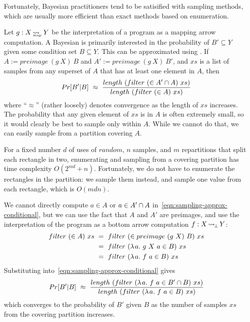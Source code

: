 Fortunately, Bayesian practitioners tend to be satisified with sampling methods, which are usually more efficient than exact methods based on enumeration.

Let $g : X \operatorname{\rightsquigarrow_{\mspace{-21mu}_\mathrm{map}}} Y$ be the interpretation of a program as a mapping arrow computation.
A Bayesian is primarily interested in the probability of $B' \subseteq Y$ given some condition set $B \subseteq Y$.
This can be approximated using .
If $A := preimage~(g~X)~B$ and $A' := preimage~(g~X)~B'$, and $xs$ is a list of samples from any superset of $A$ that has at least one element in $A$, then
\begin{equation}
	Pr[B'|B] \ \approx \ \frac{length~(filter~(\in A' \i A)~xs)}{length~(filter~(\in A)~xs)}
\label{eqn:sampling-approx-conditional}
\end{equation}
where ``$\approx$'' (rather loosely) denotes convergence as the length of $xs$ increases.
The probability that any given element of $xs$ is in $A$ is often extremely small, so it would clearly be best to sample only within $A$.
While we cannot do that, we can easily sample from a partition covering $A$.

For a fixed number $\mathit{d}$ of uses of $random$, $\mathit{n}$ samples, and $\mathit{m}$ repartitions that split each rectangle in two, enumerating and sampling from a covering partition has time complexity $\mathit{O}(2^\mathit{md} + \mathit{n})$.
Fortunately, we do not have to enumerate the rectangles in the partition: we sample them instead, and sample one value from each rectangle, which is $\mathit{O(mdn)}$.

We cannot directly compute $a \in A$ or $a \in A' \cap A$ in~\eqref{eqn:sampling-approx-conditional}, but we can use the fact that $A$ and $A'$ are preimages, and use the interpretation of the program as a bottom arrow computation $f : X \operatorname{\rightsquigarrow_{\mspace{-3mu}\bot}} Y$:
\begin{equation}
\begin{aligned}
	filter~(\in A)~xs
		&\ = \ filter~(\in preimage~(g~X)~B)~xs
\\
		&\ = \ filter~(\lambda\mspace{2mu}{a}\ldotp\,{g~X~a \in B})~xs
\\
		&\ = \ filter~(\lambda\mspace{2mu}{a}\ldotp\,{f~a \in B})~xs
\end{aligned}
\end{equation}
Substituting into~\eqref{eqn:sampling-approx-conditional} gives
\begin{equation}
	Pr[B'|B] \ \approx \ \frac{length~(filter~(\fun{a}{f~a \in B' \i B})~xs)}{length~(filter~(\fun{a}{f~a \in B})~xs)}
\end{equation}
which converges to the probability of $B'$ given $B$ as the number of samples $xs$ from the covering partition increases.


